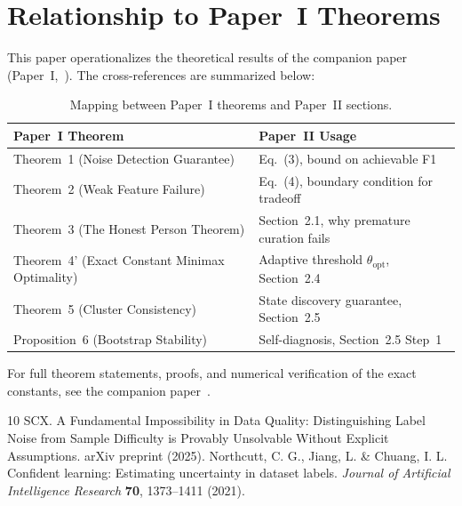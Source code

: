 \documentclass[11pt]{article}
\begin{document}
\section{Relationship to Paper~I Theorems}

This paper operationalizes the theoretical results of the companion paper (Paper~I,~\cite{xi2025fundamental}). The cross-references are summarized below:

\begin{table}[h]
\centering
\caption{Mapping between Paper~I theorems and Paper~II sections.}
\label{tab:crossref}
\begin{tabular}{ll}
\hline
Paper~I Theorem & Paper~II Usage \\
\hline
Theorem~1 (Noise Detection Guarantee) & Eq.~(3), bound on achievable F1 \\
Theorem~2 (Weak Feature Failure) & Eq.~(4), boundary condition for tradeoff \\
Theorem~3 (The Honest Person Theorem) & Section~2.1, why premature curation fails \\
Theorem~4' (Exact Constant Minimax Optimality) & Adaptive threshold $\theta_{\text{opt}}$, Section~2.4 \\
Theorem~5 (Cluster Consistency) & State discovery guarantee, Section~2.5 \\
Proposition~6 (Bootstrap Stability) & Self-diagnosis, Section~2.5 Step~1 \\
\hline
\end{tabular}
\end{table}

For full theorem statements, proofs, and numerical verification of the exact constants, see the companion paper~\cite{xi2025fundamental}.

\begin{thebibliography}{10}
 SCX. A Fundamental Impossibility in Data Quality: Distinguishing Label Noise from Sample Difficulty is Provably Unsolvable Without Explicit Assumptions. arXiv preprint (2025).
 Northcutt, C. G., Jiang, L. \& Chuang, I. L. Confident learning: Estimating uncertainty in dataset labels. \textit{Journal of Artificial Intelligence Research} \textbf{70}, 1373--1411 (2021).
\end{thebibliography}
\end{document}
